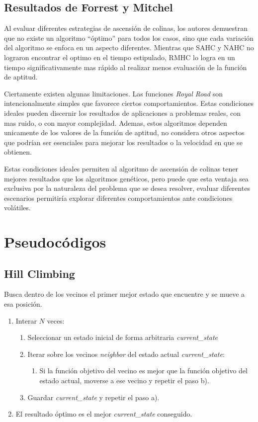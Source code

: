 \documentclass[12pt,twoside]{article}
\begin{document}
	
	\subsection{Resultados de Forrest y Mitchel}

	Al evaluar diferentes estrategias de ascensión de colinas, los autores demuestran que no existe un algoritmo ``óptimo'' para todos los casos, sino que cada variación del algoritmo se enfoca en un aspecto diferentes. Mientras que SAHC y NAHC no lograron encontrar el optimo en el tiempo estipulado, RMHC lo logra en un tiempo significativamente mas rápido al realizar menos evaluación de la función de aptitud.
	
	Ciertamente existen  algunas limitaciones. Las funciones \textit{Royal Road} son intencionalmente simples que favorece ciertos comportamientos. Estas condiciones ideales pueden discernir los resultados de aplicaciones a problemas reales, con mas ruido, o con mayor complejidad. Ademas, estos algoritmos dependen unicamente de los valores de la función de aptitud, no considera otros aspectos que podrían ser esenciales para mejorar los resultados o la velocidad en que se obtienen.
	
	Estas condiciones ideales permiten al algoritmo de ascensión de colinas tener mejores resultados que los algoritmos genéticos, pero puede que esta ventaja sea exclusiva por la naturaleza del problema que se desea resolver, evaluar diferentes escenarios permitiría explorar diferentes comportamientos ante condiciones volátiles.


	\clearpage
	\section{Pseudocódigos}
	
	\subsection{Hill Climbing}
	
	Busca dentro de los vecinos el primer mejor estado que encuentre y se mueve a esa posición.
	
	\begin{enumerate}
		\item Interar $N$ veces:
		\begin{enumerate}
			\item Seleccionar un estado inicial de forma arbitraria \textit{current\_state}
			\item Iterar sobre los vecinos \textit{neighbor} del estado actual \textit{current\_state}:
			\begin{enumerate}
				\item Si la función objetivo del vecino es mejor que la función objetivo del estado actual, moverse a ese vecino y repetir el paso b). 
			\end{enumerate}
			\item Guardar \textit{current\_state} y repetir el paso a).
		\end{enumerate}
		\item El resultado óptimo es el mejor \textit{current\_state} conseguido.
	\end{enumerate}
	
\end{document}
